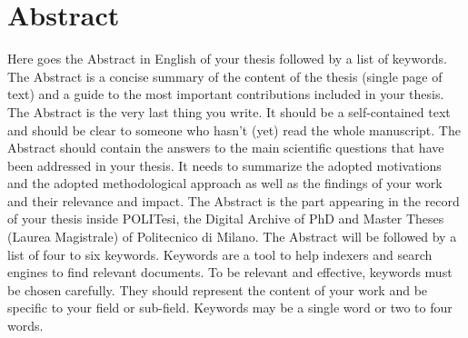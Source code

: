 \documentclass{Configuration_Files/PoliMi3i_thesis}
\begin{document}

\pagestyle{empty} %
\frontmatter %


\startpreamble
\setcounter{page}{1} %

\chapter*{Abstract} 
Here goes the Abstract in English of your thesis followed by a list of keywords.
The Abstract is a concise summary of the content of the thesis (single page of text)
and a guide to the most important contributions included in your thesis.
The Abstract is the very last thing you write.
It should be a self-contained text and should be clear to someone who hasn't (yet) read the whole manuscript.
The Abstract should contain the answers to the main scientific questions that have been addressed in your thesis.
It needs to summarize the adopted motivations and the adopted methodological approach as well as the findings of your work and their relevance and impact.
The Abstract is the part appearing in the record of your thesis inside POLITesi,
the Digital Archive of PhD and Master Theses (Laurea Magistrale) of Politecnico di Milano.
The Abstract will be followed by a list of four to six keywords.
Keywords are a tool to help indexers and search engines to find relevant documents.
To be relevant and effective, keywords must be chosen carefully.
They should represent the content of your work and be specific to your field or sub-field.
Keywords may be a single word or two to four words. 
\end{document}
